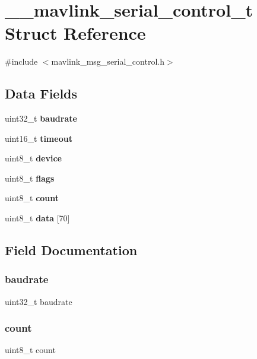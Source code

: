 \section{\+\_\+\+\_\+mavlink\+\_\+serial\+\_\+control\+\_\+t Struct Reference}
\label{struct____mavlink__serial__control__t}


{\ttfamily \#include $<$mavlink\+\_\+msg\+\_\+serial\+\_\+control.\+h$>$}

\subsection*{Data Fields}
\begin{DoxyCompactItemize}
\item 
uint32\+\_\+t \textbf{ baudrate}
\item 
uint16\+\_\+t \textbf{ timeout}
\item 
uint8\+\_\+t \textbf{ device}
\item 
uint8\+\_\+t \textbf{ flags}
\item 
uint8\+\_\+t \textbf{ count}
\item 
uint8\+\_\+t \textbf{ data} [70]
\end{DoxyCompactItemize}


\subsection{Field Documentation}
\mbox{\label{struct____mavlink__serial__control__t_ac4f06ea26ed6bd7ae83b92d64ac10b78}} 
\subsubsection{baudrate}
{\footnotesize\ttfamily uint32\+\_\+t baudrate}

\mbox{\label{struct____mavlink__serial__control__t_a20302e2c99a60d3f612dba57e3f6333b}} 
\subsubsection{count}
{\footnotesize\ttfamily uint8\+\_\+t count}

